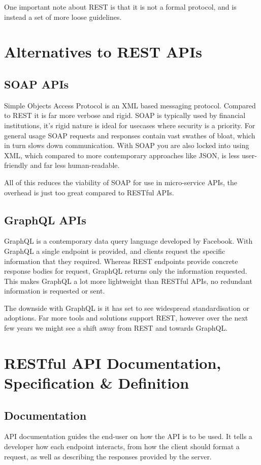 One important note about REST is that it is not a formal protocol, and is instead a set of more loose guidelines. 
\section{Alternatives to REST APIs}
\subsection{SOAP APIs}
Simple Objects Access Protocol is an XML based messaging protocol. Compared to REST it is far more verbose and rigid. SOAP is typically used by financial institutions, it's rigid nature is ideal for usecases where security is  a priority. For general usage SOAP requests and responses contain vast swathes of bloat, which in turn slows down communication. With SOAP you are also locked into using XML, which compared to more contemporary approaches like JSON, is less user-friendly and far less human-readable.

All of this reduces the viability of SOAP for use in micro-service APIs, the overhead is just too great compared to RESTful APIs.

\subsection{GraphQL APIs}
GraphQL is a contemporary data query language developed by Facebook. With GraphQL a single endpoint is provided, and clients request the specific information that they required. Whereas REST endpoints provide concrete response bodies for request, GraphQL returns only the information requested. This makes GraphQL a lot more lightweight than RESTful APIs, no redundant information is requested or sent.

The downside with GraphQL is it has set to see widespread standardisation or adoptions. Far more tools and solutions support REST, however over the next few years we might see a shift away from REST and towards GraphQL. 

\section{RESTful API Documentation, Specification \& Definition}
\subsection{Documentation}
API documentation guides the end-user on how the API is to be used. It tells a developer how each endpoint interacts, from how the client should format a request, as well as describing the responses provided by the server.

